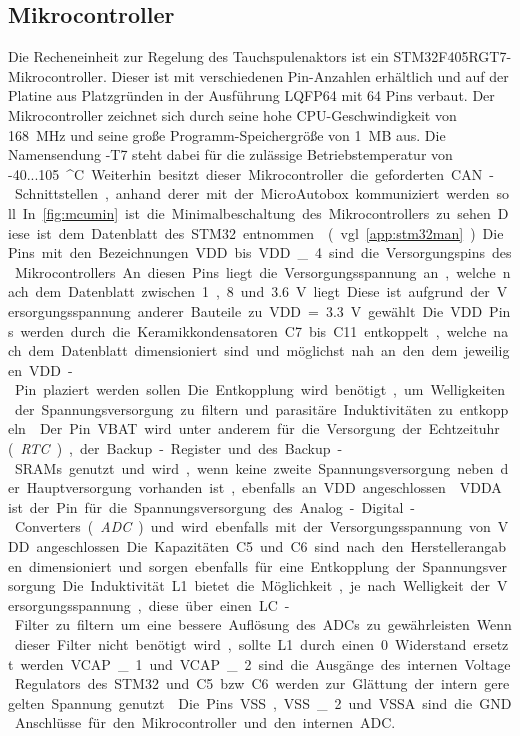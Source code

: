 \subsection{Mikrocontroller}\label{sec:mcu_kap4}
Die Recheneinheit zur Regelung des Tauchspulenaktors ist ein STM32F405RGT7-Mikrocontroller. Dieser ist mit verschiedenen Pin-Anzahlen erhältlich und auf der Platine aus Platzgründen in der Ausführung LQFP64 mit 64 Pins verbaut. Der Mikrocontroller zeichnet sich durch seine hohe CPU-Geschwindigkeit von \SI{168}{MHz} und seine große Programm-Speichergröße von \SI{1}{MB} aus. Die Namensendung -T7 steht dabei für die zulässige Betriebstemperatur von -40...\SI{105}{^\circ C}. Weiterhin besitzt dieser Mikrocontroller die geforderten CAN-Schnittstellen, anhand derer mit der MicroAutobox kommuniziert werden soll. In \autoref{fig:mcumin} ist die Minimalbeschaltung des Mikrocontrollers zu sehen. Diese ist dem Datenblatt des STM32 entnommen \cite[S.77]{stm32} (vgl. \autoref{app:stm32man}). Die Pins mit den Bezeichnungen VDD bis VDD\_4 sind die Versorgungspins des Mikrocontrollers. An diesen Pins liegt die Versorgungsspannung an, welche nach dem Datenblatt zwischen 1,8 und \SI{3,6}{V} liegt. Diese ist aufgrund der Versorgungsspannung anderer Bauteile zu VDD = \SI{3,3}{V} gewählt. Die VDD Pins werden durch die Keramikkondensatoren C7 bis C11 entkoppelt, welche nach dem Datenblatt dimensioniert sind und möglichst nah an den dem jeweiligen VDD-Pin plaziert werden sollen. Die Entkopplung wird benötigt, um Welligkeiten der Spannungsversorgung zu filtern und parasitäre Induktivitäten zu entkoppeln \cite{decoupling}. Der Pin VBAT wird unter anderem für die Versorgung der Echtzeituhr (\textit{RTC}), der Backup-Register und des Backup-SRAMs genutzt und wird, wenn keine zweite Spannungsversorgung neben der Hauptversorgung vorhanden ist, ebenfalls an VDD angeschlossen \cite[S.31]{stm32}. VDDA ist der Pin für die Spannungsversorgung des Analog-Digital-Converters (\textit{ADC}) und wird ebenfalls mit der Versorgungsspannung von VDD angeschlossen. Die Kapazitäten C5 und C6 sind nach den Herstellerangaben dimensioniert und sorgen ebenfalls für eine Entkopplung der Spannungsversorgung. Die Induktivität L1 bietet die Möglichkeit, je nach Welligkeit der Versorgungsspannung, diese über einen LC-Filter zu filtern um eine bessere Auflösung des ADCs zu gewährleisten. Wenn dieser Filter nicht benötigt wird, sollte L1 durch einen \SI{0}{\Omega} Widerstand ersetzt werden.
VCAP\_1 und VCAP\_2 sind die Ausgänge des internen Voltage Regulators des STM32 und C5 bzw. C6 werden zur Glättung der intern geregelten Spannung genutzt \cite[S.77]{stm32}. Die Pins VSS, VSS\_2 und VSSA sind die GND Anschlüsse für den Mikrocontroller und den internen ADC.
